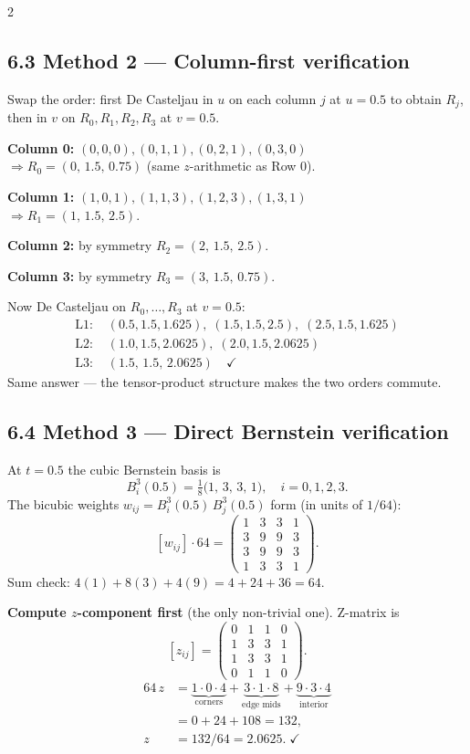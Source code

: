\begin{paracol}{2}
\subsection*{6.3 Method 2 --- Column-first verification}

Swap the order: first De Casteljau in $u$ on each column $j$ at $u=0.5$ to obtain $R_j$, then in $v$ on $R_0,R_1,R_2,R_3$ at $v=0.5$.

\textbf{Column 0:} $(0,0,0),(0,1,1),(0,2,1),(0,3,0)$\\
$\Rightarrow R_0=(0,\,1.5,\,0.75)$ (same $z$-arithmetic as Row 0).

\textbf{Column 1:} $(1,0,1),(1,1,3),(1,2,3),(1,3,1)$\\
$\Rightarrow R_1=(1,\,1.5,\,2.5)$.

\textbf{Column 2:} by symmetry $R_2=(2,\,1.5,\,2.5)$.

\textbf{Column 3:} by symmetry $R_3=(3,\,1.5,\,0.75)$.

Now De Casteljau on $R_0,\dots,R_3$ at $v=0.5$:
\begin{align*}
\text{L1: }& (0.5,1.5,1.625),\;(1.5,1.5,2.5),\;(2.5,1.5,1.625)\\
\text{L2: }& (1.0,1.5,2.0625),\;(2.0,1.5,2.0625)\\
\text{L3: }& (1.5,\,1.5,\,2.0625)\quad\checkmark
\end{align*}
Same answer --- the tensor-product structure makes the two orders commute.

\subsection*{6.4 Method 3 --- Direct Bernstein verification}

At $t=0.5$ the cubic Bernstein basis is
\[
B_i^3(0.5)=\tfrac{1}{8}\big(1,\,3,\,3,\,1\big),\quad i=0,1,2,3.
\]
The bicubic weights $w_{ij}=B_i^3(0.5)\,B_j^3(0.5)$ form (in units of $1/64$):
\[
[w_{ij}]\cdot 64=
\begin{pmatrix}
1 & 3 & 3 & 1\\
3 & 9 & 9 & 3\\
3 & 9 & 9 & 3\\
1 & 3 & 3 & 1
\end{pmatrix}.
\]
Sum check: $4(1)+8(3)+4(9)=4{+}24{+}36=64$. \checkmark

\textbf{Compute $z$-component first} (the only non-trivial one). Z-matrix is
\[
[z_{ij}]=\begin{pmatrix}0&1&1&0\\1&3&3&1\\1&3&3&1\\0&1&1&0\end{pmatrix}.
\]
\begin{align*}
64\,z &= \underbrace{1\!\cdot\!0\!\cdot\!4}_{\text{corners}} + \underbrace{3\!\cdot\!1\!\cdot\!8}_{\text{edge mids}} + \underbrace{9\!\cdot\!3\!\cdot\!4}_{\text{interior}}\\
&= 0 + 24 + 108 = 132,\\
z &= 132/64 = 2.0625.\;\checkmark
\end{align*}


\end{paracol}
